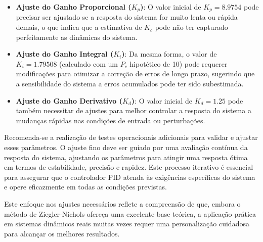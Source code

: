\begin{itemize}
    \item \textbf{Ajuste do Ganho Proporcional (\( K_p \))}: O valor inicial de \( K_p = 8.9754 \) pode precisar ser ajustado se a resposta do sistema for muito lenta ou rápida demais, o que indica que a estimativa de \( K_c \) pode não ter capturado perfeitamente as dinâmicas do sistema.
    \item \textbf{Ajuste do Ganho Integral (\( K_i \))}: Da mesma forma, o valor de \( K_i = 1.79508 \) (calculado com um \( P_c \) hipotético de 10) pode requerer modificações para otimizar a correção de erros de longo prazo, sugerindo que a sensibilidade do sistema a erros acumulados pode ter sido subestimada.
    \item \textbf{Ajuste do Ganho Derivativo (\( K_d \))}: O valor inicial de \( K_d = 1.25 \) pode também necessitar de ajustes para melhor controlar a resposta do sistema a mudanças rápidas nas condições de entrada ou perturbações.
\end{itemize}

Recomenda-se a realização de testes operacionais adicionais para validar e ajustar esses parâmetros. O ajuste fino deve ser guiado por uma avaliação contínua da resposta do sistema, ajustando os parâmetros para atingir uma resposta ótima em termos de estabilidade, precisão e rapidez. Este processo iterativo é essencial para assegurar que o controlador PID atenda às exigências específicas do sistema e opere eficazmente em todas as condições previstas.

Este enfoque nos ajustes necessários reflete a compreensão de que, embora o método de Ziegler-Nichols ofereça uma excelente base teórica, a aplicação prática em sistemas dinâmicos reais muitas vezes requer uma personalização cuidadosa para alcançar os melhores resultados.


